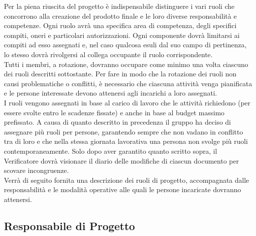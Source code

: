 Per la piena riuscita del progetto è indispensabile distinguere i vari ruoli che concorrono alla creazione del prodotto finale e le loro diverse responsabilità e competenze.
Ogni ruolo avrà una specifica area di competenza, degli specifici compiti, oneri e particolari autorizzazioni. Ogni componente dovrà limitarsi ai compiti ad esso assegnati e, nel caso qualcosa esuli dal suo campo di pertinenza, lo stesso dovrà rivolgersi al collega occupante il ruolo corrispondente.\\
Tutti i membri, a rotazione, dovranno occupare come minimo una volta ciascuno dei ruoli descritti sottostante. Per fare in modo che la rotazione dei ruoli non causi problematiche o conflitti, è necessario che ciascuna attività venga pianificata e le persone interessate devono attenersi agli incarichi a loro assegnati.\\
I ruoli vengono assegnati in base al carico di lavoro che le attività richiedono (per essere svolte entro le scadenze fissate) e anche in base al budget massimo prefissato. A causa di quanto descritto in precedenza il gruppo ha deciso di assegnare più ruoli per persone, garantendo sempre che non vadano in conflitto tra di loro e che nella stessa giornata lavorativa una persona non svolge più ruoli contemporaneamente.
Solo dopo aver garantito quanto scritto sopra, il Verificatore dovrà visionare il diario delle modifiche di ciascun documento per scovare incongruenze.\\
Verrà di seguito fornita una descrizione dei ruoli di progetto, accompagnata dalle responsabilità e le modalità operative alle quali le persone incaricate dovranno attenersi.

\subsection{Responsabile di Progetto} %

